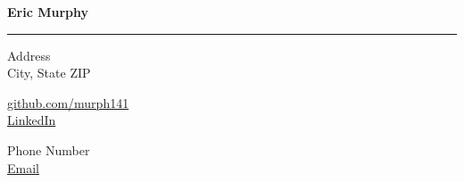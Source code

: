 \documentclass[11pt]{article} %
\begin{document}
\thispagestyle{empty}


\newcommand{\Heading}[1]
{
  \noindent \newline {\large \bf #1}
  \smallskip \hrule \vspace{-5pt}
}

\newcommand{\Activity}[4]
{
  {\bf #1}, {\it #2} \hfill #3 -- #4 \\
}

\newcommand{\ActivityWithLink}[4]
{
  \href{#1}{\bf #2}, {\it #3} \hfill #4 \\
}

\newcommand{\SpacedBullet}[1]
{
  \hspace{0.3in} #1 \\
}



\centerline{\LARGE \bf Eric Murphy}

\hrule height 0.9pt \vspace{-10pt} %

\begin{multicols}{3}

  \begin{flushleft}
    Address \\
    City, State ZIP \\
  \end{flushleft}

  \begin{center}
    \href{https://www.github.com/murph141}{github.com/murph141} \\
    \href{}{LinkedIn} \\
  \end{center}

  \begin{flushright}
    Phone Number \\
    \href{}{Email} \\
  \end{flushright}

\end{multicols}


\vspace{-5pt}
\end{document}
